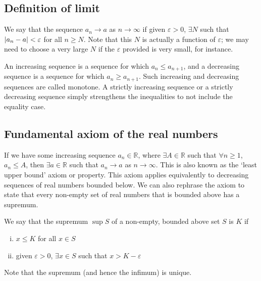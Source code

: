 \subsection{Definition of limit}
\begin{definition}
	We say that the sequence \(a_n \to a\) as \(n \to \infty\) if given \(\varepsilon > 0\), \(\exists N\) such that \(\abs{a_n - a} < \varepsilon\) for all \(n \geq N\).
	Note that this \(N\) is actually a function of \(\varepsilon\); we may need to choose a very large \(N\) if the \(\varepsilon\) provided is very small, for instance.
\end{definition}
\begin{definition}
	An increasing sequence is a sequence for which \(a_n \leq a_{n+1}\), and a decreasing sequence is a sequence for which \(a_n \geq a_{n+1}\).
	Such increasing and decreasing sequences are called monotone.
	A strictly increasing sequence or a strictly decreasing sequence simply strengthens the inequalities to not include the equality case.
\end{definition}

\subsection{Fundamental axiom of the real numbers}
If we have some increasing sequence \(a_n \in \mathbb R\), where \(\exists A \in \mathbb R\) such that \(\forall n \geq 1\), \(a_n \leq A\), then \(\exists a \in \mathbb R\) such that \(a_n \to a\) as \(n \to \infty\).
This is also known as the `least upper bound' axiom or property.
This axiom applies equivalently to decreasing sequences of real numbers bounded below.
We can also rephrase the axiom to state that every non-empty set of real numbers that is bounded above has a supremum.
\begin{definition}
	We say that the supremum \(\sup S\) of a non-empty, bounded above set \(S\) is \(K\) if
	\begin{enumerate}[(i)]
		\item \(x \leq K\) for all \(x \in S\)
		\item given \(\varepsilon > 0\), \(\exists x \in S\) such that \(x > K - \varepsilon\)
	\end{enumerate}
\end{definition}
Note that the supremum (and hence the infimum) is unique.

